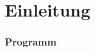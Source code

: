 \section{Einleitung}

\author{Ervin Mazlagi\'c}

\begin{frame}\frametitle{Programm\hfill{}\footnotesize \group}
\tableofcontents[hideallsubsections]
\end{frame}

